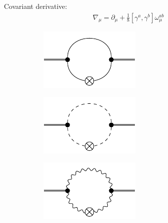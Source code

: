 Covariant derivative:
\begin{align}
	\nabla_{\mu} = \partial_{\mu} + \frac{1}{8}\left[\gamma^{a}, \gamma^{b}\right]\omega_{\mu}^{ab}
\end{align}


 \begin{figure}[t]
 \centering
 \hfill
 \begin{subfigure}{0.3\textwidth} 
	\includegraphics[width=\textwidth]{figs/TikZ/fermion_contribution}
 \end{subfigure}
 \hfill
 \begin{subfigure}{0.3\textwidth} 
 	\includegraphics[width=\textwidth]{figs/TikZ/scalar_contribution}
 \end{subfigure} 
 \hfill
 \begin{subfigure}{0.3\textwidth} 
 	\includegraphics[width=\textwidth]{figs/TikZ/gauge_field_contribution}

\end{subfigure}
\end{figure}
